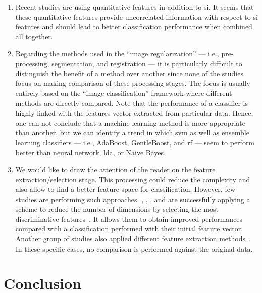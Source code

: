 \begin{enumerate}
\item Recent studies are using quantitative features in addition to \ac{si}.
It seems that these quantitative features provide uncorrelated information with respect to \ac{si} features and should lead to better classification performance when combined all together. 

\item Regarding the methods used in the ``image regularization'' --- i.e., pre-processing, segmentation, and registration --- it is particularly difficult to distinguish the benefit of a method over another since none of the studies focus on making comparison of these processing stages.
The focus is usually entirely based on the ``image classification'' framework where different methods are directly compared.
Note that the performance of a classifier is highly linked with the features vector extracted from particular data.
Hence, one can not conclude that a machine learning method is more appropriate than another, but we can identify a trend in which \ac{svm} as well as ensemble learning classifiers --- i.e., AdaBoost, GentleBoost, and \ac{rf} --- seem to perform better than neural network, \ac{lda}, or Naive Bayes.

\item We would like to draw the attention of the reader on the feature extraction/selection stage.
This processing could reduce the complexity and also allow to find a better feature space for classification.
However, few studies are performing such approaches.
\citeauthor{Niaf2012}, \citeauthor{khalvati2015automated}, \citeauthor{chung2015prostate}, and \citeauthor{rampun2016computer} are successfully applying a scheme to reduce the number of dimensions by selecting the most discriminative features~\cite{Niaf2011,Niaf2012,khalvati2015automated,chung2015prostate,rampun2016computer,rampun2015computer}.
It allows them to obtain improved performances compared with a classification performed with their initial feature vector.
Another group of studies also applied different feature extraction methods~\cite{Viswanath2008a,Viswanath2008,Viswanath2012,Tiwari2007,Tiwari2008,Tiwari2009,Tiwari2010,Tiwari2012,Tiwari2013,lehaire2014computer,rampun2016computerb,rampun2015classifying}.
In these specific cases, no comparison is performed against the original data.
\end{enumerate}

\section{Conclusion}\label{subsec:chp3:dis:gen-dis}

